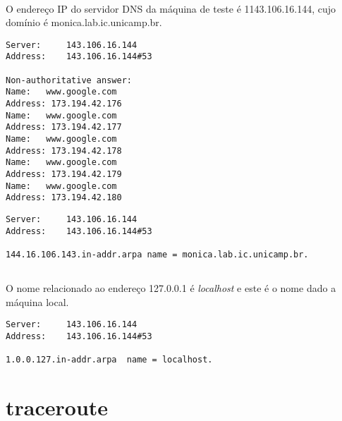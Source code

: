 \documentclass[a4paper,10pt,oneside,final,titlepage,onecolumn]{article}
\begin{document}
\paragraph{}O endereço IP do servidor DNS da máquina de teste é \mbox{1143.106.16.144}, cujo domínio é \mbox{monica.lab.ic.unicamp.br}.
\begin{lstlisting}
Server:		143.106.16.144
Address:	143.106.16.144#53

Non-authoritative answer:
Name:	www.google.com
Address: 173.194.42.176
Name:	www.google.com
Address: 173.194.42.177
Name:	www.google.com
Address: 173.194.42.178
Name:	www.google.com
Address: 173.194.42.179
Name:	www.google.com
Address: 173.194.42.180
\end{lstlisting}
\begin{lstlisting}
Server:		143.106.16.144
Address:	143.106.16.144#53

144.16.106.143.in-addr.arpa	name = monica.lab.ic.unicamp.br.
\end{lstlisting}


\subsection{}
\paragraph{}O nome relacionado ao endereço \mbox{127.0.0.1} é \emph{localhost} e este é o nome dado a máquina local.
\begin{lstlisting}
Server:		143.106.16.144
Address:	143.106.16.144#53

1.0.0.127.in-addr.arpa	name = localhost.
\end{lstlisting}



\section{traceroute}

\subsection{}
\end{document}
